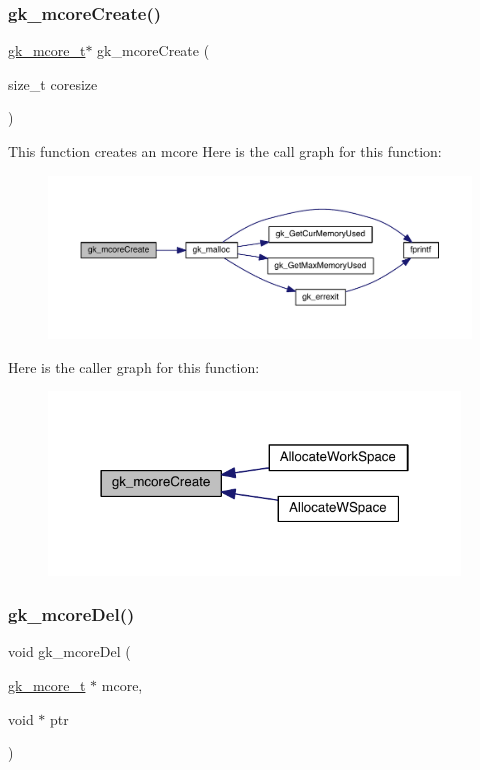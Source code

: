 \subsubsection{\texorpdfstring{gk\+\_\+mcore\+Create()}{gk\_mcoreCreate()}}
{\footnotesize\ttfamily \hyperlink{a00682}{gk\+\_\+mcore\+\_\+t}$\ast$ gk\+\_\+mcore\+Create (\begin{DoxyParamCaption}\item[{size\+\_\+t}]{coresize }\end{DoxyParamCaption})}

This function creates an mcore Here is the call graph for this function\+:\nopagebreak
\begin{figure}[H]
\begin{center}
\leavevmode
\includegraphics[width=350pt]{a00107_aba5df0f5155d88c0331fd6c996b483ed_cgraph}
\end{center}
\end{figure}
Here is the caller graph for this function\+:\nopagebreak
\begin{figure}[H]
\begin{center}
\leavevmode
\includegraphics[width=310pt]{a00107_aba5df0f5155d88c0331fd6c996b483ed_icgraph}
\end{center}
\end{figure}
\mbox{\label{a00107_a0e63861ea56a62080a63408af43a9075}} 
\subsubsection{\texorpdfstring{gk\+\_\+mcore\+Del()}{gk\_mcoreDel()}}
{\footnotesize\ttfamily void gk\+\_\+mcore\+Del (\begin{DoxyParamCaption}\item[{\hyperlink{a00682}{gk\+\_\+mcore\+\_\+t} $\ast$}]{mcore,  }\item[{void $\ast$}]{ptr }\end{DoxyParamCaption})}

